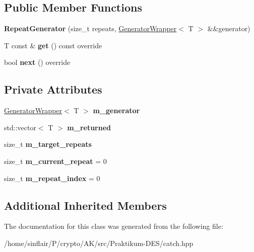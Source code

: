 \subsection*{Public Member Functions}
\begin{DoxyCompactItemize}
\item 
\mbox{\label{classCatch_1_1Generators_1_1RepeatGenerator_a3aee12c4f9c2c04823ca3c75a20f234f}} 
{\bfseries Repeat\+Generator} (size\+\_\+t repeats, \hyperlink{classCatch_1_1Generators_1_1GeneratorWrapper}{Generator\+Wrapper}$<$ T $>$ \&\&generator)
\item 
\mbox{\label{classCatch_1_1Generators_1_1RepeatGenerator_a43bd573274c9a0cd7f4406a3d0d36d49}} 
T const  \& {\bfseries get} () const override
\item 
\mbox{\label{classCatch_1_1Generators_1_1RepeatGenerator_a24d5c2b1c09d6d220d4bd4c83f222dcb}} 
bool {\bfseries next} () override
\end{DoxyCompactItemize}
\subsection*{Private Attributes}
\begin{DoxyCompactItemize}
\item 
\mbox{\label{classCatch_1_1Generators_1_1RepeatGenerator_ae4eeba772ffba6d928f959835e8db154}} 
\hyperlink{classCatch_1_1Generators_1_1GeneratorWrapper}{Generator\+Wrapper}$<$ T $>$ {\bfseries m\+\_\+generator}
\item 
\mbox{\label{classCatch_1_1Generators_1_1RepeatGenerator_aee4c7a8c54c739f2fea75c01b02ccc6e}} 
std\+::vector$<$ T $>$ {\bfseries m\+\_\+returned}
\item 
\mbox{\label{classCatch_1_1Generators_1_1RepeatGenerator_af73981a50e1e1438d0159ac0b55a84bf}} 
size\+\_\+t {\bfseries m\+\_\+target\+\_\+repeats}
\item 
\mbox{\label{classCatch_1_1Generators_1_1RepeatGenerator_ad834535fe3a2aec44bf53632c43f68cf}} 
size\+\_\+t {\bfseries m\+\_\+current\+\_\+repeat} = 0
\item 
\mbox{\label{classCatch_1_1Generators_1_1RepeatGenerator_ab311143cc38451a21de61f444fbc7cf6}} 
size\+\_\+t {\bfseries m\+\_\+repeat\+\_\+index} = 0
\end{DoxyCompactItemize}
\subsection*{Additional Inherited Members}


The documentation for this class was generated from the following file\+:\begin{DoxyCompactItemize}
\item 
/home/sinflair/\+P/crypto/\+A\+K/src/\+Praktikum-\/\+D\+E\+S/catch.\+hpp\end{DoxyCompactItemize}
